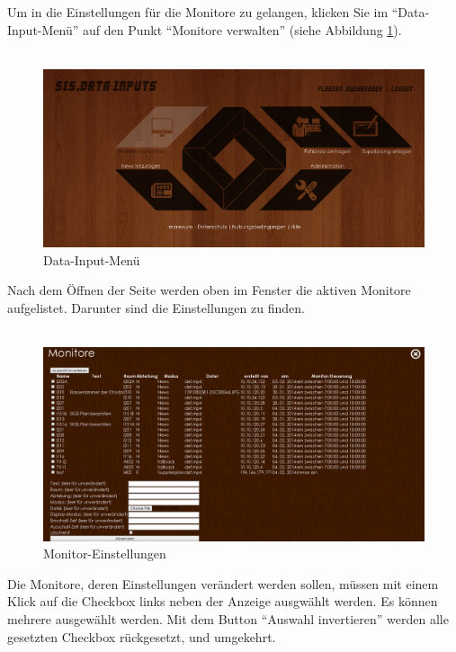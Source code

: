 Um in die Einstellungen für die Monitore zu gelangen, klicken Sie im \enquote{Data-Input-Menü} auf den Punkt \enquote{Monitore verwalten} (siehe Abbildung \ref{fig:instr_admin_monitors_dimenu}).\\
\\
\begin{figure}[H]
\centering
\includegraphics[keepaspectratio=true, width=14cm]{images/screenshots/data-inputs.png}
\caption{Data-Input-Menü}
\label{fig:instr_admin_monitors_dimenu}
\end{figure}
Nach dem Öffnen der Seite werden oben im Fenster die aktiven Monitore aufgelistet. Darunter sind die Einstellungen zu finden.\\
\\
\begin{figure}[H]
\centering
\includegraphics[keepaspectratio=true, width=14cm]{images/screenshots/monitors.png}
\caption{Monitor-Einstellungen}
\label{fig:instr_admin_monitors_site}
\end{figure}
Die Monitore, deren Einstellungen verändert werden sollen, müssen mit einem Klick auf die Checkbox links neben der Anzeige ausgwählt werden. Es können mehrere ausgewählt werden. Mit dem Button \enquote{Auswahl invertieren} werden alle gesetzten Checkbox rückgesetzt, und umgekehrt.
\\
